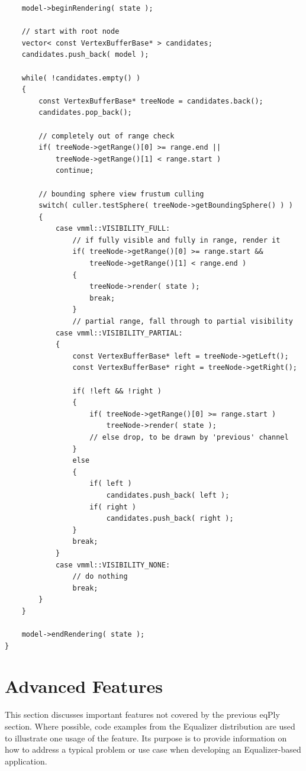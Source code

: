 \documentclass[10pt,a4]{scrartcl}
\begin{document}
{\footnotesize\begin{lstlisting}
    model->beginRendering( state );
        
    // start with root node
    vector< const VertexBufferBase* > candidates;
    candidates.push_back( model );
        
    while( !candidates.empty() )
    {
        const VertexBufferBase* treeNode = candidates.back();
        candidates.pop_back();
            
        // completely out of range check
        if( treeNode->getRange()[0] >= range.end || 
            treeNode->getRange()[1] < range.start )
            continue;
            
        // bounding sphere view frustum culling
        switch( culler.testSphere( treeNode->getBoundingSphere() ) )
        {
            case vmml::VISIBILITY_FULL:
                // if fully visible and fully in range, render it
                if( treeNode->getRange()[0] >= range.start && 
                    treeNode->getRange()[1] < range.end )
                {
                    treeNode->render( state );
                    break;
                }
                // partial range, fall through to partial visibility
            case vmml::VISIBILITY_PARTIAL:
            {
                const VertexBufferBase* left = treeNode->getLeft();
                const VertexBufferBase* right = treeNode->getRight();
            
                if( !left && !right )
                {
                    if( treeNode->getRange()[0] >= range.start )
                        treeNode->render( state );
                    // else drop, to be drawn by 'previous' channel
                }
                else
                {
                    if( left )
                        candidates.push_back( left );
                    if( right )
                        candidates.push_back( right );
                }
                break;
            }
            case vmml::VISIBILITY_NONE:
                // do nothing
                break;
        }
    }
        
    model->endRendering( state );
}
\end{lstlisting}}


\section{Advanced Features}

This section discusses important features not covered by the previous
\textsf{eqPly} section. Where possible, code examples from the Equalizer
distribution are used to illustrate one usage of the feature. Its
purpose is to provide information on how to address a typical problem or
use case when developing an Equalizer-based application.
\end{document}
